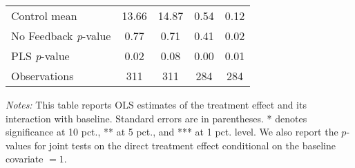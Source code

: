 \begin{table}[ht]
{\begin{threeparttable}
\begin{tabular}{l*{4}{c}}
Control mean    &    13.66         &    14.87         &     0.54         &     0.12         \\
No Feedback \emph{p}-value&     0.77         &     0.71         &     0.41         &     0.02         \\
PLS \emph{p}-value&     0.02         &     0.08         &     0.00         &     0.01         \\
Observations    &      311         &      311         &      284         &      284         \\
\bottomrule \end{tabular} \begin{tablenotes}[flushleft] \footnotesize \item \emph{Notes:} This table reports OLS estimates of the treatment effect and its interaction with baseline. Standard errors are in parentheses. * denotes significance at 10 pct., ** at 5 pct., and *** at 1 pct. level. We also report the \(p\)-values for joint tests on the direct treatment effect conditional on the baseline covariate $= 1$. \end{tablenotes} \end{threeparttable} } \end{table}

